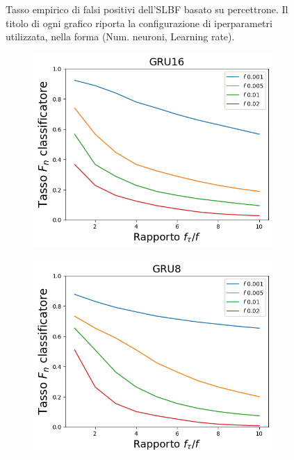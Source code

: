 \documentclass[../../main.tex]{subfiles}
\begin{document}
\begin{figure}[H]
\begin{subfigure}[b]{0.49\textwidth}
            \caption{}
            \label{fig:SLBFFPRPercettrone30}
        \end{subfigure}
        \caption{Tasso empirico di falsi positivi dell'SLBF basato su percettrone. Il titolo di ogni grafico riporta la configurazione di iperparametri utilizzata, nella forma (Num. neuroni, Learning rate).}
        \label{fig:SLBFFPRPercettrone}
    \end{figure}

    \begin{figure}[H]
        \centering
        \begin{subfigure}[b]{0.49\textwidth}
            \centering
            \includegraphics[width = \textwidth]{immagini/7/SLBF/GRU16_FNR.png}
            \caption{}
            \label{fig:SLBFFNR_GRU16}
        \end{subfigure}
        \begin{subfigure}[b]{0.49\textwidth}
            \centering
            \includegraphics[width = \textwidth]{immagini/7/SLBF/GRU8_FNR.png}

\end{subfigure}
\end{figure}
\end{document}
